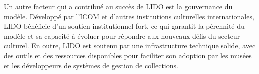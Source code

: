 Un autre facteur qui a contribué au succès de LIDO est la gouvernance du modèle. Développé par l’ICOM et d’autres institutions culturelles internationales, LIDO bénéficie d’un soutien institutionnel fort, ce qui garantit la pérennité du modèle et sa capacité à évoluer pour répondre aux nouveaux défis du secteur culturel. En outre, LIDO est soutenu par une infrastructure technique solide, avec des outils et des ressources disponibles pour faciliter son adoption par les musées et les développeurs de systèmes de gestion de collections.
